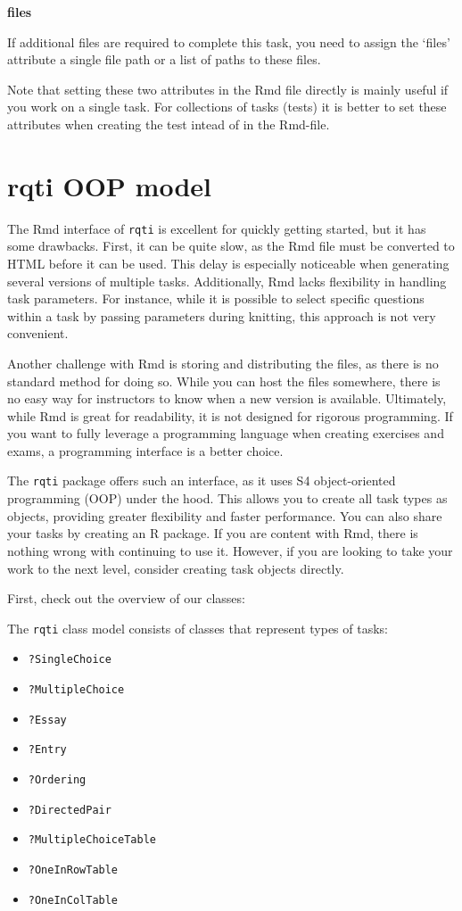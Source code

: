 \documentclass[twoside]{tufte-book}
\providecommand{\tightlist}{%
  \setlength{\itemsep}{0pt}\setlength{\parskip}{0pt}}
\begin{document}
\noindent\textbf{files}\label{files-1}

If additional files are required to complete this task, you need to assign the `files' attribute a single file path or a list of paths to these files.

Note that setting these two attributes in the Rmd file directly is mainly useful if you work on a single task. For collections of tasks (tests) it is better to set these attributes when creating the test intead of in the Rmd-file.

\chapter{rqti OOP model}\label{rqti-oop-model}

The Rmd interface of \texttt{rqti} is excellent for quickly getting started, but it has some drawbacks. First, it can be quite slow, as the Rmd file must be converted to HTML before it can be used. This delay is especially noticeable when generating several versions of multiple tasks. Additionally, Rmd lacks flexibility in handling task parameters. For instance, while it is possible to select specific questions within a task by passing parameters during knitting, this approach is not very convenient.

Another challenge with Rmd is storing and distributing the files, as there is no standard method for doing so. While you can host the files somewhere, there is no easy way for instructors to know when a new version is available. Ultimately, while Rmd is great for readability, it is not designed for rigorous programming. If you want to fully leverage a programming language when creating exercises and exams, a programming interface is a better choice.

The \texttt{rqti} package offers such an interface, as it uses S4 object-oriented programming (OOP) under the hood. This allows you to create all task types as objects, providing greater flexibility and faster performance. You can also share your tasks by creating an R package. If you are content with Rmd, there is nothing wrong with continuing to use it. However, if you are looking to take your work to the next level, consider creating task objects directly.

First, check out the overview of our classes:

The \texttt{rqti} class model consists of classes that represent types of tasks:

\begin{itemize}
\tightlist
\item
  \texttt{?SingleChoice}
\item
  \texttt{?MultipleChoice}
\item
  \texttt{?Essay}
\item
  \texttt{?Entry}
\item
  \texttt{?Ordering}
\item
  \texttt{?DirectedPair}
\item
  \texttt{?MultipleChoiceTable}
\item
  \texttt{?OneInRowTable}
\item
  \texttt{?OneInColTable}
\end{itemize}
\end{document}
